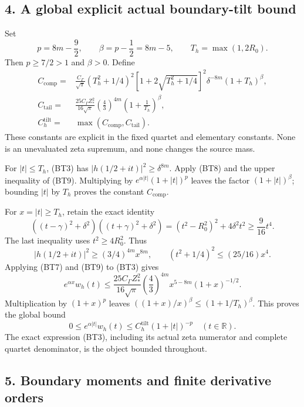 \documentclass[11pt,a4paper]{article}
\begin{document}
\subsection{4. A global explicit actual boundary-tilt bound}\label{bt:a-global-explicit-actual-boundary-tilt-bound}

Set \[
p=8m-\frac92,\qquad \beta=p-\frac12=8m-5,\qquad
T_h=\max(1,2R_0).
\tag{BT11}
\] Then \(p\ge7/2>1\) and \(\beta>0\). Define \[
\begin{split}
C_{\mathrm{comp}}
={}&\frac{C_\Gamma}{\sqrt\pi}
 (T_h^2+1/4)^2
 [1+2\sqrt{T_h^2+1/4}]^2
 \delta^{-8m}(1+T_h)^\beta,\\
C_{\mathrm{tail}}
={}&\frac{25C_\Gamma Z_*^2}{16\sqrt\pi}
 \left(\frac43\right)^{4m}
 \left(1+\frac1{T_h}\right)^\beta,\\
C_h^{\mathrm{tilt}}
={}&\max(C_{\mathrm{comp}},C_{\mathrm{tail}}).
\end{split}
\tag{BT12}
\] These constants are explicit in the fixed quartet and elementary constants. None is an unevaluated zeta supremum, and none changes the source mass.

For \(|t|\le T_h\), (BT3) has \(|h(1/2+it)|^2\ge\delta^{8m}\). Apply (BT8) and the upper inequality of (BT9). Multiplying by \(e^{\alpha|t|}(1+|t|)^p\) leaves the factor \((1+|t|)^\beta\); bounding \(|t|\) by \(T_h\) proves the constant \(C_{\mathrm{comp}}\).

For \(x=|t|\ge T_h\), retain the exact identity \[
((t-\gamma)^2+\delta^2)((t+\gamma)^2+\delta^2)
=(t^2-R_0^2)^2+4\delta^2t^2
\ge\frac9{16}t^4.
\tag{BT13}
\] The last inequality uses \(t^2\ge4R_0^2\). Thus \[
|h(1/2+it)|^2\ge(3/4)^{4m}x^{8m},
\qquad
(t^2+1/4)^2\le(25/16)x^4.
\] Applying (BT7) and (BT9) to (BT3) gives \[
e^{\alpha x}w_h(t)
\le\frac{25C_\Gamma Z_*^2}{16\sqrt\pi}
\left(\frac43\right)^{4m}
x^{5-8m}(1+x)^{-1/2}.
\] Multiplication by \((1+x)^p\) leaves \(((1+x)/x)^\beta\le(1+1/T_h)^\beta\). This proves the global bound \[
\boxed{
0\le e^{\alpha|t|}w_h(t)
\le C_h^{\mathrm{tilt}}(1+|t|)^{-p}
\quad(t\in\mathbb R).}
\tag{BT14}
\] The exact expression (BT3), including its actual zeta numerator and complete quartet denominator, is the object bounded throughout.

\subsection{5. Boundary moments and finite derivative orders}\label{bt:boundary-moments-and-finite-derivative-orders}
\end{document}
